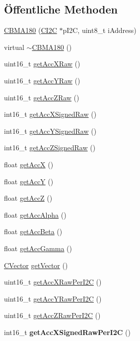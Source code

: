 \subsection*{Öffentliche \-Methoden}
\begin{DoxyCompactItemize}
\item 
\hyperlink{class_c_b_m_a180_a4f07fb4e031d55899dda017623301cfd}{\-C\-B\-M\-A180} (\hyperlink{class_c_i2_c}{\-C\-I2\-C} $\ast$p\-I2\-C, uint8\-\_\-t i\-Address)
\item 
virtual \hyperlink{class_c_b_m_a180_a4ee1ab160be5e9839ec62045283d9b63}{$\sim$\-C\-B\-M\-A180} ()
\item 
uint16\-\_\-t \hyperlink{class_c_b_m_a180_af45e95b6cef3448e758cf9c407b219cf}{get\-Acc\-X\-Raw} ()
\item 
uint16\-\_\-t \hyperlink{class_c_b_m_a180_af21a35191db52dee7c271d44da42bd2f}{get\-Acc\-Y\-Raw} ()
\item 
uint16\-\_\-t \hyperlink{class_c_b_m_a180_a5f4f8579e3eb267ad3b1ac828a99ece8}{get\-Acc\-Z\-Raw} ()
\item 
int16\-\_\-t \hyperlink{class_c_b_m_a180_aafcebbbc6fa319c83467ea2918360802}{get\-Acc\-X\-Signed\-Raw} ()
\item 
int16\-\_\-t \hyperlink{class_c_b_m_a180_a05accbd8a3ddf864c41bc1ef9cfb1590}{get\-Acc\-Y\-Signed\-Raw} ()
\item 
int16\-\_\-t \hyperlink{class_c_b_m_a180_af2f8ed8bdbbaa33ea051de0b4690f49b}{get\-Acc\-Z\-Signed\-Raw} ()
\item 
float \hyperlink{class_c_b_m_a180_a7e1b7e8a3dc7e35d660285648bbf2cd8}{get\-Acc\-X} ()
\item 
float \hyperlink{class_c_b_m_a180_a15562c533c3e3ecf09ee6434ad9ba349}{get\-Acc\-Y} ()
\item 
float \hyperlink{class_c_b_m_a180_a13878be864d0c1c86fb5da9a7bed1bef}{get\-Acc\-Z} ()
\item 
float \hyperlink{class_c_b_m_a180_a1479e687581a037339e5db0a26183069}{get\-Acc\-Alpha} ()
\item 
float \hyperlink{class_c_b_m_a180_a1eb83ff966920cba25c3506f90cc36f1}{get\-Acc\-Beta} ()
\item 
float \hyperlink{class_c_b_m_a180_aaef74ead21abf6fc87647ad5f63c5a03}{get\-Acc\-Gamma} ()
\item 
\hyperlink{class_c_vector}{\-C\-Vector} \hyperlink{class_c_b_m_a180_ac9344e2d63aee2f5a1ad23156e2bbfc0}{get\-Vector} ()
\item 
uint16\-\_\-t \hyperlink{class_c_b_m_a180_a989e2bdc2ac1fc5e228d469c7ed99187}{get\-Acc\-X\-Raw\-Per\-I2\-C} ()
\item 
uint16\-\_\-t \hyperlink{class_c_b_m_a180_a2b37888a1df1fd1d0c17c95bb6c7e15a}{get\-Acc\-Y\-Raw\-Per\-I2\-C} ()
\item 
uint16\-\_\-t \hyperlink{class_c_b_m_a180_accd1c61c0323e5acbd47cd1b1176084f}{get\-Acc\-Z\-Raw\-Per\-I2\-C} ()
\item 
\hypertarget{class_c_b_m_a180_aca9a02a8a24b408f1a27de0f6303491f}{int16\-\_\-t {\bfseries get\-Acc\-X\-Signed\-Raw\-Per\-I2\-C} ()}\label{class_c_b_m_a180_aca9a02a8a24b408f1a27de0f6303491f}


\end{DoxyCompactItemize}

